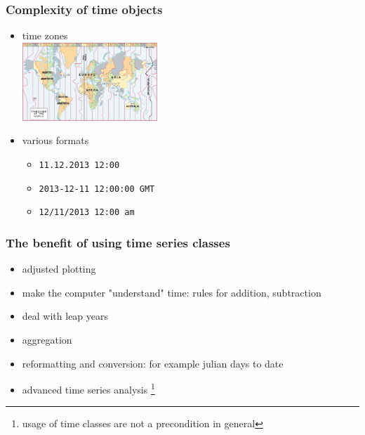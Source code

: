 \documentclass[xcolor=table, xcolor=dvipsnames]{beamer}\usepackage[]{graphicx}\usepackage[]{color}
\begin{document}

\begin{frame}\frametitle{Complexity of time objects}
\begin{itemize}
\item time zones \medskip\\
\includegraphics[width=0.4\textwidth]{externalfig/timezones.png}
\item various formats
\begin{itemize}
  \item \texttt{11.12.2013 12:00}
  \item \texttt{2013-12-11 12:00:00 GMT}
  \item \texttt{12/11/2013 12:00 am}
\end{itemize}
\end{itemize}
\end{frame}


\begin{frame}\frametitle{The benefit of using time series classes}
\begin{itemize}
\item adjusted plotting
\item make the computer "understand" time: rules for addition, subtraction
\item deal with leap years
\item aggregation
\item reformatting and conversion: for example julian days to date
\item advanced time series analysis \footnote{usage of time classes are not a precondition in general}
\end{itemize}
\end{frame}

\end{document}
